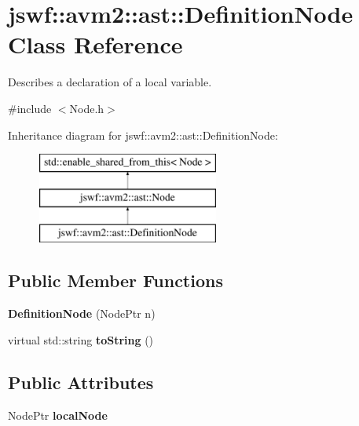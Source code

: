 \hypertarget{classjswf_1_1avm2_1_1ast_1_1_definition_node}{\section{jswf\+:\+:avm2\+:\+:ast\+:\+:Definition\+Node Class Reference}
\label{classjswf_1_1avm2_1_1ast_1_1_definition_node}
}


Describes a declaration of a local variable.  




{\ttfamily \#include $<$Node.\+h$>$}

Inheritance diagram for jswf\+:\+:avm2\+:\+:ast\+:\+:Definition\+Node\+:\begin{figure}[H]
\begin{center}
\leavevmode
\includegraphics[height=3.000000cm]{classjswf_1_1avm2_1_1ast_1_1_definition_node}
\end{center}
\end{figure}
\subsection*{Public Member Functions}
\begin{DoxyCompactItemize}
\item 
\hypertarget{classjswf_1_1avm2_1_1ast_1_1_definition_node_a5c64f80e2ae2503f7f69feac7439d646}{{\bfseries Definition\+Node} (Node\+Ptr n)}\label{classjswf_1_1avm2_1_1ast_1_1_definition_node_a5c64f80e2ae2503f7f69feac7439d646}

\item 
\hypertarget{classjswf_1_1avm2_1_1ast_1_1_definition_node_a07f6fa62d6bed6a2f7eda2b593dc6644}{virtual std\+::string {\bfseries to\+String} ()}\label{classjswf_1_1avm2_1_1ast_1_1_definition_node_a07f6fa62d6bed6a2f7eda2b593dc6644}

\end{DoxyCompactItemize}
\subsection*{Public Attributes}
\begin{DoxyCompactItemize}
\item 
\hypertarget{classjswf_1_1avm2_1_1ast_1_1_definition_node_a32afc61156fda02394fbec80fa9e779d}{Node\+Ptr {\bfseries local\+Node}}\label{classjswf_1_1avm2_1_1ast_1_1_definition_node_a32afc61156fda02394fbec80fa9e779d}

\end{DoxyCompactItemize}


